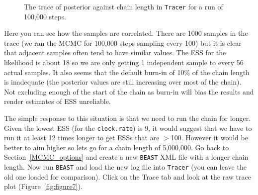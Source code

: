 \documentclass[cup7b, english]{cupbook}
\begin{document}
\begin{figure}[htbp]
\begin{center}
\leavevmode
{}
\end{center}
\caption{The trace of posterior against chain length in \texttt{Tracer} for a run of 100,000 steps.}
\label{fig:figure6}
\end{figure}

Here you can see how the samples are correlated. There are 1000 samples in the trace
(we ran the MCMC for 100,000 steps sampling every 100) but it is clear that adjacent
samples often tend to have similar values. The ESS for the likelihood is about 18 so we
are only getting 1 independent sample to every 56 actual samples. It also seems
that the default burn-in of 10\% of the chain length is inadequate (the posterior values
are still increasing over most of the chain). Not excluding enough
of the start of the chain as burn-in will bias the results and render estimates of ESS
unreliable.

The simple response to this situation is that we need to run the chain for longer. Given the lowest
ESS (for the \texttt{clock.rate}) is 9, it would suggest that we have to run it at least 12
times longer to get ESSs that are $>$100. However it would be better to aim higher so lets
go for a chain length of 5,000,000. Go back to Section~\ref{MCMC_options}
and create a new \texttt{BEAST} XML file with a longer chain length. Now run \texttt{BEAST} and load the new
log file into \texttt{Tracer} (you can leave the old one loaded for comparison). Click on the Trace
tab and look at the raw trace plot (Figure~\ref{fig:figure7}).
\end{document}
